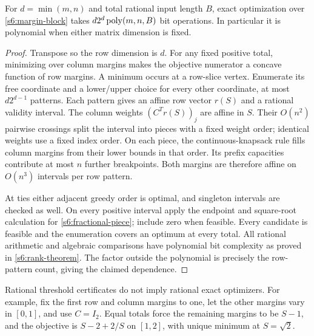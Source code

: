 \begin{theorem}\label{app:margin-fpt}
For $d=\min(m,n)$ and total rational input length $B$, exact optimization
over \eqref{s6:margin-block} takes
$d2^d\operatorname{poly}(m,n,B)$ bit operations. In particular it is polynomial
when either matrix dimension is fixed.
\end{theorem}
\begin{proof}
Transpose so the row dimension is $d$. For any fixed positive total,
minimizing over column margins makes the objective numerator a concave
function of row margins. A minimum occurs at a row-slice vertex.
Enumerate its free coordinate and a lower/upper choice for every other
coordinate, at most $d2^{d-1}$ patterns. Each pattern gives an affine
row vector $r(S)$ and a rational validity interval. The column weights
$(C^Tr(S))_j$ are affine in $S$. Their $O(n^2)$ pairwise crossings split
the interval into pieces with a fixed weight order; identical weights
use a fixed index order. On each piece, the continuous-knapsack rule
fills column margins from their lower bounds in that order. Its prefix
capacities contribute at most $n$ further breakpoints. Both margins
are therefore affine on $O(n^3)$ intervals per row pattern.

At ties either adjacent greedy order is optimal, and singleton intervals
are checked as well. On every positive interval apply the endpoint and
square-root calculation for \eqref{s6:fractional-piece}; include zero
when feasible. Every candidate is feasible and the enumeration covers
an optimum at every total. All rational arithmetic and algebraic
comparisons have polynomial bit complexity as proved in
\cref{s6:rank-theorem}. The factor outside the polynomial is precisely
the row-pattern count, giving the claimed dependence.
\end{proof}

Rational threshold certificates do not imply rational exact optimizers.
For example, fix the first row and column margins to one, let the other
margins vary in $[0,1]$, and use $C=I_2$. Equal totals force the remaining
margins to be $S-1$, and the objective is $S-2+2/S$ on $[1,2]$,
with unique minimum at $S=\sqrt2$.
